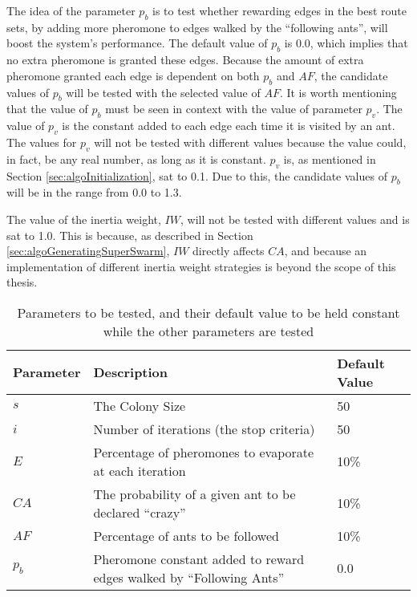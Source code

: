 The idea of the parameter $p_b$ is to test whether rewarding edges in the best route sets, by adding more pheromone to edges walked by the ``following ants'', will boost the system's performance. The default value of $p_b$ is 0.0, which implies that no extra pheromone is granted these edges. Because the amount of extra pheromone granted each edge is dependent on both $p_b$ and $AF$, the candidate values of $p_b$ will be tested with the selected value of $AF$. It is worth mentioning that the value of $p_b$ must be seen in context with the value of parameter $p_v$. The value of $p_v$ is the constant added to each edge each time it is visited by an ant. The values for $p_v$ will not be tested with different values because the value could, in fact, be any real number, as long as it is constant. $p_v$ is, as mentioned in Section \vref{sec:algoInitialization}, sat to 0.1. Due to this, the candidate values of $p_b$ will be in the range from 0.0 to 1.3. 

The value of the inertia weight, $IW$, will not be tested with different values and is sat to 1.0. This is because, as described in Section \vref{sec:algoGeneratingSuperSwarm}, $IW$ directly affects $CA$, and because an implementation of different inertia weight strategies is beyond the scope of this thesis. 

\begin{table}[H]
    \centering
    \begin{tabular}{|l|m{7cm}|l|}
        \hline
        \textbf{Parameter} & \textbf{Description} & \textbf{Default Value}\\
        \hline
        $s$ & The Colony Size & 50\\
        
        $i$ & Number of iterations (the stop criteria) & 50\\
        
        $E$ & Percentage of pheromones to evaporate at each iteration & 10\%\\
        
        $CA$ & The probability of a given ant to be declared ``crazy'' & 10\%\\
        
        $AF$ & Percentage of ants to be followed & 10\%\\
        
        $p_b$ & Pheromone constant added to reward edges walked by ``Following Ants'' & 0.0\\
           \hline
    \end{tabular}
    \caption {Parameters to be tested, and their default value to be held constant while the other parameters are tested}
    \label{table:parameters}
\end{table}

